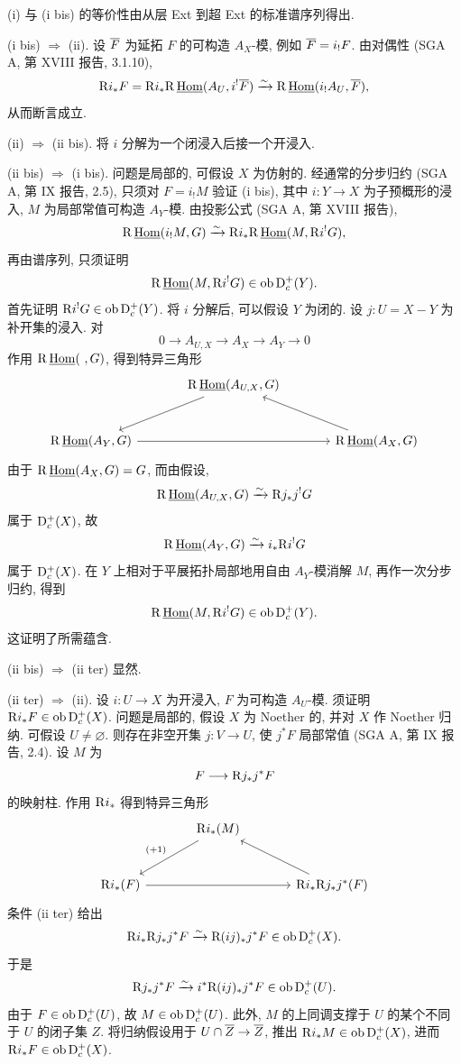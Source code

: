 \begin{prooftext}
(i) 与 (i bis) 的等价性由从层 Ext 到超 Ext 的标准谱序列得出.

(i bis) $\Rightarrow$ (ii). 设 $\overline{F}$ 为延拓 $F$ 的可构造 $A_X$-模, 例如 $\overline{F}=i_!F$. 由对偶性 (SGA A, 第 XVIII 报告, 3.1.10),
\[
   \mathrm R i_*F
    =\mathrm R i_*\mathrm R\,\underline{\operatorname{Hom}}(A_U,i^!\overline{F})
    \xrightarrow{\sim}
      \mathrm R\,\underline{\operatorname{Hom}}(i_!A_U,\overline{F}),
\]
从而断言成立.

(ii) $\Rightarrow$ (ii bis). 将 $i$ 分解为一个闭浸入后接一个开浸入.

(ii bis) $\Rightarrow$ (i bis). 问题是局部的, 可假设 $X$ 为仿射的. 经通常的分步归约 (SGA A, 第 IX 报告, 2.5), 只须对 $F=i_!M$ 验证 (i bis), 其中 $i:Y\to X$ 为子预概形的浸入, $M$ 为局部常值可构造 $A_Y$-模. 由投影公式 (SGA A, 第 XVIII 报告),
\[
   \mathrm R\,\underline{\operatorname{Hom}}(i_!M,G)
      \xrightarrow{\sim}
   \mathrm R i_*\mathrm R\,\underline{\operatorname{Hom}}(M,\mathrm R i^!G),
\]
再由谱序列, 只须证明
\[
   \mathrm R\,\underline{\operatorname{Hom}}(M,\mathrm R i^!G)\in\operatorname{ob}\mathrm{D}_c^+(Y).
\]
首先证明 $\mathrm R i^!G\in\operatorname{ob}\mathrm{D}_c^+(Y)$. 将 $i$ 分解后, 可以假设 $Y$ 为闭的. 设 $j:U=X-Y$ 为补开集的浸入. 对
\[
   0\longrightarrow A_{U,X}\longrightarrow A_X\longrightarrow A_Y\longrightarrow0
\]
作用 $\mathrm R\,\underline{\operatorname{Hom}}(\ ,G)$, 得到特异三角形
\[
\begin{tikzcd}[column sep=large,row sep=large]
& \R\,\underline{\Hom}(A_{U,X},G) \arrow[dl] & \\
\R\,\underline{\Hom}(A_Y,G) \arrow[rr] & & \R\,\underline{\Hom}(A_X,G) \arrow[ul]
\end{tikzcd}
\]
由于 $\mathrm R\,\underline{\operatorname{Hom}}(A_X,G)=G$, 而由假设,
\[
   \mathrm R\,\underline{\operatorname{Hom}}(A_{U,X},G)\xrightarrow{\sim}\mathrm R j_*j^!G
\]
属于 $\mathrm{D}_c^+(X)$, 故
\[
   \mathrm R\,\underline{\operatorname{Hom}}(A_Y,G)\xrightarrow{\sim}i_*\mathrm R i^!G
\]
属于 $\mathrm{D}_c^+(X)$. 在 $Y$ 上相对于平展拓扑局部地用自由 $A_Y$-模消解 $M$, 再作一次分步归约, 得到
\[
   \mathrm R\,\underline{\operatorname{Hom}}(M,\mathrm R i^!G)\in\operatorname{ob}\mathrm{D}_c^+(Y).
\]
这证明了所需蕴含.

(ii bis) $\Rightarrow$ (ii ter) 显然.

(ii ter) $\Rightarrow$ (ii). 设 $i:U\to X$ 为开浸入, $F$ 为可构造 $A_U$-模. 须证明 $\mathrm R i_*F\in\operatorname{ob}\mathrm{D}_c^+(X)$. 问题是局部的, 假设 $X$ 为 Noether 的, 并对 $X$ 作 Noether 归纳. 可假设 $U\ne\varnothing$. 则存在非空开集 $j:V\to U$, 使 $j^*F$ 局部常值 (SGA A, 第 IX 报告, 2.4). 设 $M$ 为
\[
   F\longrightarrow \mathrm R j_*j^*F
\]
的映射柱. 作用 $\mathrm R i_*$ 得到特异三角形
\[
\begin{tikzcd}[column sep=large,row sep=large]
& \R i_*(M) \arrow[dl,"{(+1)}"'] & \\
\R i_*(F) \arrow[rr] & & \R i_*\R j_*j^*(F) \arrow[ul]
\end{tikzcd}
\]
条件 (ii ter) 给出
\[
   \mathrm R i_*\mathrm R j_*j^*F\xrightarrow{\sim}\mathrm R(ij)_*j^*F\in\operatorname{ob}\mathrm{D}_c^+(X).
\]
于是
\[
   \mathrm R j_*j^*F\xrightarrow{\sim}i^*\mathrm R(ij)_*j^*F\in\operatorname{ob}\mathrm{D}_c^+(U).
\]
由于 $F\in\operatorname{ob}\mathrm{D}_c^+(U)$, 故 $M\in\operatorname{ob}\mathrm{D}_c^+(U)$. 此外, $M$ 的上同调支撑于 $U$ 的某个不同于 $U$ 的闭子集 $Z$. 将归纳假设用于 $U\cap\overline{Z}\to\overline{Z}$, 推出 $\mathrm R i_*M\in\operatorname{ob}\mathrm{D}_c^+(X)$, 进而 $\mathrm R i_*F\in\operatorname{ob}\mathrm{D}_c^+(X)$.


\end{prooftext}
